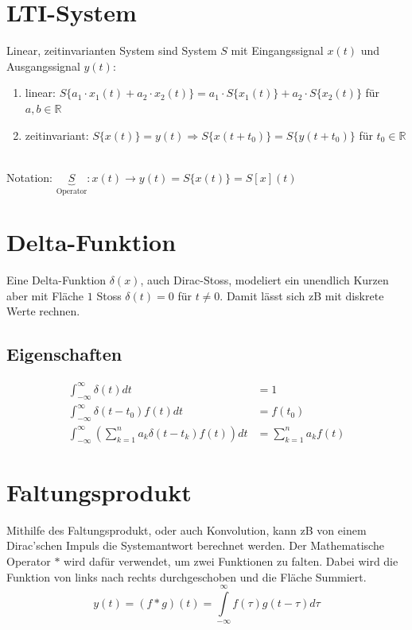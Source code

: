 \section{LTI-System}
Linear, zeitinvarianten System sind System $S$ mit Eingangssignal $x(t)$ und Ausgangssignal $y(t)$:
\begin{enumerate}[nosep]
	\item linear: $S\{a_1 \cdot x_1(t) + a_2 \cdot x_2(t)\} = a_1 \cdot S\{x_1(t)\} + a_2 \cdot S\{x_2(t)\}$ für $a,b \in \mathbb{R}$
	\item zeitinvariant: $S\{x(t)\} = y(t) \Rightarrow  S\{x(t + t_0)\} = S\{y(t + t_0)\}$ für $t_0 \in \mathbb{R}$
\end{enumerate}
~\\
Notation: $\underbrace{S}_\text{Operator}: x(t) \rightarrow y(t) = S\{x(t)\} = S[x](t)$

\section{Delta-Funktion}
Eine Delta-Funktion $\delta(x)$, auch Dirac-Stoss, modeliert ein unendlich Kurzen aber mit Fläche $1$ Stoss $\delta(t) = 0$ für $t \neq 0$. Damit lässt sich zB mit diskrete Werte rechnen.

\subsection{Eigenschaften}
\begin{align*}
	\int_{-\infty}^{\infty}\delta(t)dt &= 1 \\
	\int_{-\infty}^{\infty}\delta(t - t_0)f(t)dt &= f(t_0) \\
	\int_{-\infty}^{\infty}\left(\sum_{k=1}^{n}a_k\delta(t - t_k)f(t)\right)dt &= \sum_{k=1}^{n}a_kf(t)
\end{align*}

\section{Faltungsprodukt}
Mithilfe des Faltungsprodukt, oder auch Konvolution, kann zB von einem Dirac'schen Impuls die Systemantwort berechnet werden. Der Mathematische Operator $*$ wird dafür verwendet, um zwei Funktionen zu falten. Dabei wird die Funktion von links nach rechts durchgeschoben und die Fläche Summiert.
\[
y(t) = (f * g)(t) = \int\limits_{-\infty}^{\infty}f(\tau)g(t - \tau)d\tau
\]

